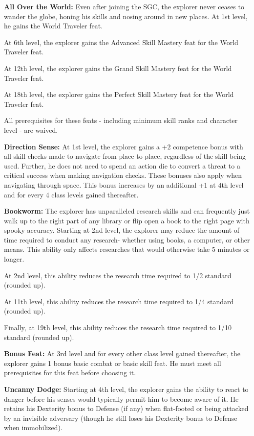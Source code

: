 \vspace*{5pt}

\textbf{All Over the World:} Even after joining the SGC, the explorer never ceases to wander the globe, honing his skills and nosing around in new places. At 1st level, he gains the World Traveler feat.

At 6th level, the explorer gains the Advanced Skill Mastery feat for the World Traveler feat.

At 12th level, the explorer gains the Grand Skill Mastery feat for the World Traveler feat.

At 18th level, the explorer gains the Perfect Skill Mastery feat for the World Traveler feat.

All prerequisites for these feats - including minimum skill ranks and character level - are waived.

\textbf{Direction Sense:} At 1st level, the explorer gains a +2 competence bonus with all skill checks made to navigate from place to place, regardless of the skill being used. Further, he does not need to spend an action die to convert a threat to a critical success when making navigation checks. These bonuses also apply when navigating through space. This bonus increases by an additional +1 at 4th level and for every 4 class levels gained thereafter.

\textbf{Bookworm:} The explorer has unparalleled research skills and can frequently just walk up to the right part of any library or flip open a book to the right page with spooky accuracy. Starting at 2nd level, the explorer may reduce the amount of time required to conduct any research- whether using books, a computer, or other means. This ability only affects researches that would otherwise take 5 minutes or longer.

At 2nd level, this ability reduces the research time required to 1/2 standard (rounded up).

At 11th level, this ability reduces the research time required to 1/4 standard (rounded up).

Finally, at 19th level, this ability reduces the research time required to 1/10 standard (rounded up).

\textbf{Bonus Feat:} At 3rd level and for every other class level gained thereafter, the explorer gains 1 bonus basic combat or basic skill feat. He must meet all prerequisites for this feat before choosing it.

\textbf{Uncanny Dodge:} Starting at 4th level, the explorer gains the ability to react to danger before his senses would typically permit him to become aware of it. He retains his Dexterity bonus to Defense (if any) when flat-footed or being attacked by an invisible adversary (though he still loses his Dexterity bonus to Defense when immobilized).

